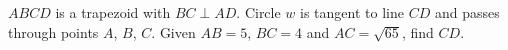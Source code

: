 $ABCD$ is a trapezoid with $BC \perp AD$. Circle $w$ is tangent to line $CD$ and passes through points $A$, $B$, $C$. Given $AB=5$, $BC=4$ and $AC=\sqrt{65}$, find $CD$. 